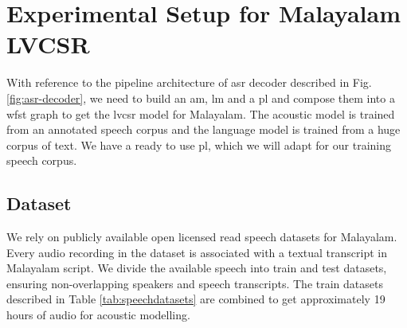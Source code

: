 \section{Experimental Setup for Malayalam LVCSR}

With reference to the pipeline architecture of \gls{asr} decoder described in Fig. \ref{fig:asr-decoder}, we need to build an \gls{am}, \gls{lm} and  a \gls{pl} and compose them into a \gls{wfst} graph to get the \gls{lvcsr} model for Malayalam. The acoustic model is trained from an annotated speech corpus and the language model is trained from a huge corpus of text. We have a ready to use \gls{pl}, which we will adapt for our training speech corpus.

\subsection{Dataset}
\label{sec:Chapter5-dataset}

We rely on publicly available open licensed read speech datasets
\cite{baby2016resources,he-etal-2020-open, prahallad2012iiit} for Malayalam.
Every audio recording in the dataset is associated with a textual transcript in
Malayalam script. We divide the available speech into train and test datasets,
ensuring non-overlapping speakers and speech transcripts.%
The train datasets described in Table \ref{tab:speechdatasets} are combined to
get approximately 19 hours of audio for acoustic modelling.


